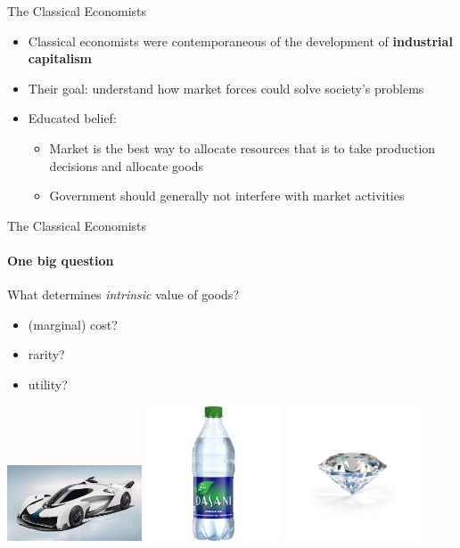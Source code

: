 \begin{frame}{The Classical Economists}
\protect\hypertarget{the-classical-economists}{}
\begin{itemize}
\item
  Classical economists were contemporaneous of the development of
  \textbf{industrial capitalism}
\item
  Their goal: understand how market forces could solve society's
  problems
\item
  Educated belief:

  \begin{itemize}
  \tightlist
  \item
    Market is the best way to allocate resources that is to take
    production decisions and allocate goods
  \item
    Government should generally not interfere with market activities
  \end{itemize}
\end{itemize}
\end{frame}

\begin{frame}{The Classical Economists}
\protect\hypertarget{the-classical-economists-1}{}
\framesubtitle{One big question}

What determines \emph{intrinsic} value of goods?

\begin{itemize}
\tightlist
\item
  (marginal) cost?
\item
  rarity?
\item
  utility?
\end{itemize}

\includegraphics[width=0.3\textwidth,height=\textheight]{assets/car.jpeg}
\includegraphics[width=0.3\textwidth,height=\textheight]{assets/dasani.jpeg}
\includegraphics[width=0.3\textwidth,height=\textheight]{assets/diamond.png}
\end{frame}


